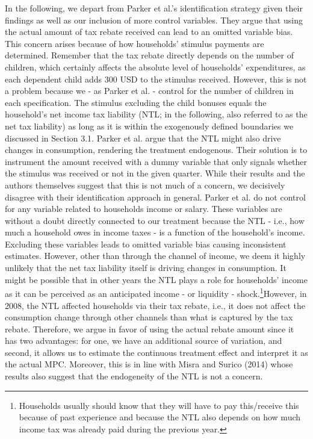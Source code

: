 In the following, we depart from Parker et al.'s identification strategy given their findings as well as our inclusion of more control variables. They argue that using the actual amount of tax rebate received can lead to an omitted variable bias. This concern arises because of how households' stimulus payments are determined. Remember that the tax rebate directly depends on the number of children, which certainly affects the absolute level of households' expenditures, as each dependent child adds 300 USD to the stimulus received. However, this is not a problem because we - as Parker et al. - control for the number of children in each specification. The stimulus excluding the child bonuses equals the household's net income tax liability (NTL; in the following, also referred to as the net tax liability) as long as it is within the exogenously defined boundaries we discussed in Section 3.1. Parker et al. argue that the NTL might also drive changes in consumption, rendering the treatment endogenous. Their solution is to instrument the amount received with a dummy variable that only signals whether the stimulus was received or not in the given quarter. While their results and the authors themselves suggest that this is not much of a concern, we decisively disagree with their identification approach in general. Parker et al. do not control for any variable related to households income or salary. These variables are without a doubt directly connected to our treatment because the NTL - i.e., how much a household owes in income taxes - is a function of the household's income. Excluding these variables leads to omitted variable bias causing inconsistent estimates. However, other than through the channel of income, we deem it highly unlikely that the net tax liability itself is driving changes in consumption. It might be possible that in other years the NTL plays a role for households' income as it can be perceived as an anticipated income - or liquidity - shock.\footnote{Households usually should know that they will have to pay this/receive this because of past experience and because the NTL also depends on how much income tax was already paid during the previous year.}However, in 2008, the NTL affected households via their tax rebate, i.e., it does not affect the consumption change through other channels than what is captured by the tax rebate. Therefore, we argue in favor of using the actual rebate amount since it has two advantages: for one, we have an additional source of variation, and second, it allows us to estimate the continuous treatment effect and interpret it as the actual MPC. Moreover, this is in line with Misra and Surico (2014) whose results also suggest that the endogeneity of the NTL is not a concern.


